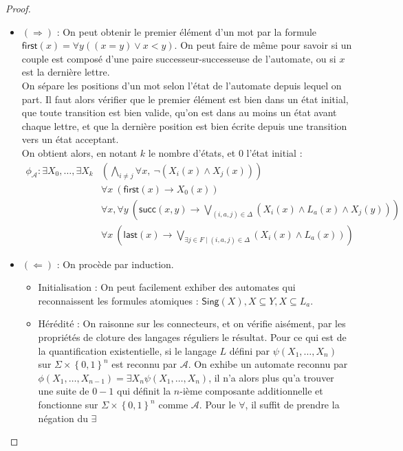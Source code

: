 \documentclass{cours}
\begin{document}
\begin{proof}
    \begin{itemize}
        \item $(\Rightarrow)$ : On peut obtenir le premier élément d'un mot par la formule $\textsf{first}(x) = \forall y ((x = y)\lor x < y)$. On peut faire de même pour savoir si un couple est composé d'une paire successeur-successeuse de l'automate, ou si $x$ est la dernière lettre.\\
        On sépare les positions d'un mot selon l'état de l'automate depuis lequel on part. Il faut alors vérifier que le premier élément est bien dans un état initial, que toute transition est bien valide, qu'on est dans au moins un état avant chaque lettre, et que la dernière position est bien écrite depuis une transition vers un état acceptant. \\
        On obtient alors, en notant $k$ le nombre d'états, et $0$ l'état initial : 
        \begin{equation}
            \begin{split}
                \phi_{\mathcal{A}} : \exists X_{0}, \ldots, \exists X_{k} & \left(\bigwedge_{i \neq j} \forall x, \ \lnot \left(X_{i}(x) \land X_{j}(x)\right)\right)\\
                & \forall x \ \left(\textsf{first}(x) \rightarrow X_{0}(x)\right)\\
                & \forall x, \forall y \ \left(\textsf{succ}(x, y) \rightarrow \bigvee_{(i, a, j) \in \Delta}\left(X_{i}(x) \land L_{a}(x) \land X_{j}(y)\right)\right)\\
                & \forall x \ \left(\textsf{last}(x) \rightarrow \bigvee_{\exists j \in F \mid (i, a, j) \in \Delta} \left(X_{i}(x) \land L_{a}(x)\right)\right)
            \end{split}
        \end{equation}
        \item $(\Leftarrow)$ : On procède par induction. 
        \begin{itemize}
            \item Initialisation : On peut facilement exhiber des automates qui reconnaissent les formules atomiques : $\textsf{Sing}(X), X \subseteq Y, X \subseteq L_{a}$.
            \item Hérédité : On raisonne sur les connecteurs, et on vérifie aisément, par les propriétés de cloture des langages réguliers le résultat. Pour ce qui est de la quantification existentielle, si le langage $L$ défini par $\psi(X_{1}, \ldots, X_{n})$ sur $\Sigma\times\left\{0, 1\right\}^{n}$ est reconnu par $\mathcal{A}$. On exhibe un automate reconnu par $\phi(X_{1}, \ldots, X_{n-1}) = \exists X_{n}\psi(X_{1}, \ldots, X_{n})$, il n'a alors plus qu'a trouver une suite de $0-1$ qui définit la $n$-ième composante additionnelle et fonctionne sur $\Sigma\times\left\{0, 1\right\}^{n}$ comme $\mathcal{A}$. Pour le $\forall$, il suffit de prendre la négation du $\exists$
        \end{itemize}
    \end{itemize}
    
    
\end{proof}


    
\end{document}
